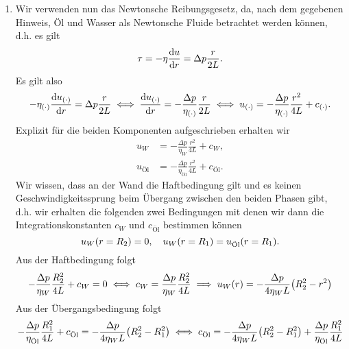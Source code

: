 \documentclass{exercise}
\begin{document}
\begin{enumerate}
        \begin{center}
        \end{center}
        \item Wir verwenden nun das Newtonsche Reibungsgesetz, da, nach dem gegebenen Hinweis, Öl und Wasser als Newtonsche Fluide betrachtet werden können, d.h. es gilt
        \[
            \tau = -\eta\frac{\d u}{\d r} = \Delta p\frac{r}{2L}.
        \]
        Es gilt also
        \[
            -\eta_{\parentheses*{\cdot}}\frac{\d u_{\parentheses*{\cdot}}}{\d r} = \Delta p\frac{r}{2L} \iff \frac{\d u_{\parentheses*{\cdot}}}{\d r} = -\frac{\Delta p}{\eta_{\parentheses*{\cdot}}}\frac{r}{2L} \iff u_{\parentheses*{\cdot}} = -\frac{\Delta p}{\eta_{\parentheses*{\cdot}}}\frac{r^2}{4L} + c_{\parentheses*{\cdot}}.
        \]
        Explizit für die beiden Komponenten aufgeschrieben erhalten wir
        \begin{align*}
            u_W &= -\frac{\Delta p}{\eta_W}\frac{r^2}{4L} + c_W,\\
            u_{\text{Öl}} &= -\frac{\Delta p}{\eta_{\text{Öl}}}\frac{r^2}{4L} + c_{\text{Öl}}.
        \end{align*}
        Wir wissen, dass an der Wand die Haftbedingung gilt und es keinen Geschwindigkeitssprung beim Übergang zwischen den beiden Phasen gibt, d.h. wir erhalten die folgenden zwei Bedingungen mit denen wir dann die Integrationskonstanten \(c_W\) und \(c_{\text{Öl}}\) bestimmen können
        \[
            u_W\parentheses*{r = R_2} = 0, \quad u_W\parentheses*{r = R_1} = u_{\text{Öl}}\parentheses*{r = R_1}.
        \]
        Aus der Haftbedingung folgt
        \[
            -\frac{\Delta p}{\eta_W}\frac{R_2^2}{4L} + c_W = 0 \iff c_W = \frac{\Delta p}{\eta_W}\frac{R_2^2}{4L} \implies u_W\parentheses*{r} = -\frac{\Delta p}{4\eta_W L}\parentheses*{R_2^2 - r^2}
        \]
        Aus der Übergangsbedingung folgt
        \[
            -\frac{\Delta p}{\eta_{\text{Öl}}}\frac{R_1^2}{4L} + c_{\text{Öl}} = -\frac{\Delta p}{4\eta_W L}\parentheses*{R_2^2 - R_1^2} \iff c_{\text{Öl}} = -\frac{\Delta p}{4\eta_W L}\parentheses*{R_2^2 - R_1^2} + \frac{\Delta p}{\eta_{\text{Öl}}}\frac{R_1^2}{4L}
\]
\end{enumerate}
\end{document}
